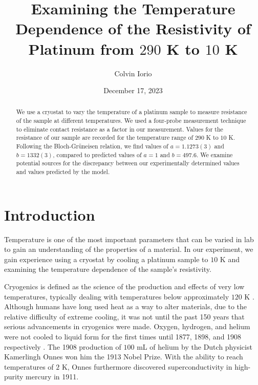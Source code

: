 \documentclass[11pt,letterpaper]{article}
\begin{document}
\title{Examining the Temperature Dependence of the Resistivity of Platinum from $290$ K to $10$ K}

\author{Colvin Iorio}

\date{December 17, 2023}
\maketitle


\begin{abstract}
    We use a cryostat to vary the temperature of a platinum sample to measure resistance of the sample at different temperatures. We used a four-probe measurement technique to eliminate contact resistance as a factor in our measurement. Values for the resistance of our sample are recorded for the temperature range of $290$ K to $10$ K. Following the Bloch-Grüneisen relation, we find values of $a = 1.1273(3)$ and $b = 1332(3)$, compared to predicted values of $a = 1$ and $b = 497.6$. We examine potential sources for the discrepancy between our experimentally determined values and values predicted by the model.
\end{abstract}


\section{Introduction}\label{sec intro}

Temperature is one of the most important parameters that can be varied in lab to gain an understanding of the properties of a material. In our experiment, we gain experience using a cryostat by cooling a platinum sample to $10$ K and examining the temperature dependence of the sample's resistivity.

Cryogenics is defined as the science of the production and effects of very low temperatures, typically dealing with temperatures below approximately $120$ K \cite{Radebaugh}. Although humans have long used heat as a way to alter materials, due to the relative difficulty of extreme cooling, it was not until the past 150 years that serious advancements in cryogenics were made. Oxygen, hydrogen, and helium were not cooled to liquid form for the first times until 1877, 1898, and 1908 respectively \cite{Radebaugh2}. The 1908 production of $100$ mL of helium by the Dutch physicist Kamerlingh Onnes won him the 1913 Nobel Prize. With the ability to reach temperatures of $2$ K, Onnes furthermore discovered superconductivity in high-purity mercury in 1911.
\end{document}
